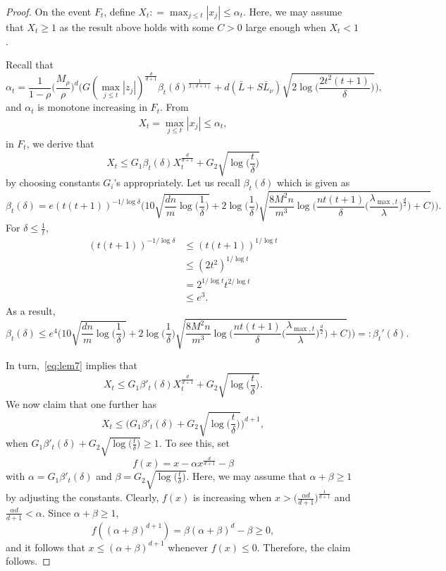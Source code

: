 \documentclass[11pt]{article}
\theoremstyle{plain}
\theoremstyle{definition}
\theoremstyle{remark}
\begin{document}
\begin{proof}
On the event $F_t$, define $X_t: = \max_{j\leq t}|x_j| \leq \alpha_t$. Here, we may assume that $X_t \geq 1$ as the result above holds with some $C>0$ large enough when $X_t <1$. 

Recall that 
\[
\alpha_t=\frac{1}{1-\rho}\bigg(\frac{M_{\rho}}{\rho}\bigg)^d\bigg(G(\max_{j \leq  t}|z_j|)^{\frac{d}{d+1}}\beta_{t}(\delta)^{\frac{1}{2(d+1)}}+d(\bar L+S\bar L_{\nu})\sqrt{2\log\bigg(\frac{2t^2(t+1)}{\delta}\bigg)}\bigg),
\]
and $\alpha_t$ is monotone increasing in $F_t$. From
\begin{align*}
X_t=\max_{j\leq t}|x_j| \leq \alpha_t,
\end{align*}
in $F_t$, we derive that
\begin{equation}\label{eq:lem7}
X_t \leq G_1 \beta_t(\delta) X_t^{\frac{d}{d+1}} + G_2 \sqrt{\log\bigg(\frac{t}{\delta}\bigg)}
\end{equation}
by choosing constants $G_i$'s appropriately. Let us recall $\beta_t(\delta)$ which is given as
\[
\beta_t(\delta) = e(t(t+1))^{-1/\log \delta}\bigg(10\sqrt{\frac{dn}{m}\log \bigg(\frac{1}{\delta}\bigg)}+ 2\log \bigg(\frac{1}{\delta}\bigg) \sqrt{\frac{8M^2n}{m^3}\log \bigg(\frac{nt(t+1)}{\delta}\bigg(\frac{\lambda_{\max,t}}{\lambda}\bigg)^{\frac{d}{2}}\bigg)+ C}\bigg)\bigg).
\]
For $\delta \leq \frac{1}{t}$, 
\begin{equation*}
    \begin{split}
        (t(t+1))^{-1/\log \delta} &\leq (t(t+1))^{1/\log t}\\ 
        &\leq (2t^2)^{1/\log t}\\
        &=2^{1/\log t} t^{2/ \log t}\\
        &\leq e^3.
    \end{split}
\end{equation*}
As a result, 
\[
\beta_t(\delta)\leq e^4\bigg(10\sqrt{\frac{dn}{m}\log \bigg(\frac{1}{\delta}\bigg)}+ 2\log \bigg(\frac{1}{\delta}\bigg) \sqrt{\frac{8M^2n}{m^3}\log \bigg(\frac{nt(t+1)}{\delta}\bigg(\frac{\lambda_{\max,t}}{\lambda}\bigg)^{\frac{d}{2}}\bigg)+ C}\bigg)\bigg)=:\beta_t'(\delta).
\]

In turn,~\eqref{eq:lem7} implies that
\[
X_t \leq G_1 \beta'_t(\delta) X_t^{\frac{d}{d+1}} + G_2 \sqrt{\log\bigg(\frac{t}{\delta}\bigg)}.
\]
We now claim that one further has
\begin{equation}\label{eq:lem_eq}
X_t \leq \bigg(G_1 \beta'_t(\delta)  + G_2 \sqrt{\log\bigg(\frac{t}{\delta}\bigg)}\bigg)^{d+1},
\end{equation}
when $G_1 \beta'_t(\delta) + G_2 \sqrt{\log\bigg(\frac{t}{\delta}\bigg)} \geq 1$. To see this, set
\[
f(x)=x- \alpha x^\frac{d}{d+1} - \beta
\]
with $\alpha=G_1 \beta'_t(\delta)$ and $\beta=G_2 \sqrt{\log\bigg(\frac{t}{\delta}\bigg)}$. Here, we may assume that $\alpha+\beta \geq 1$ by adjusting the constants. Clearly, $f(x)$ is increasing when $x>\bigg(\frac{\alpha d}{d+1}\bigg)^\frac{1}{d+1}$ and $\frac{\alpha d}{d+1}<\alpha$. Since $\alpha+\beta \geq 1$,
\[
f((\alpha+\beta)^{d+1}) = \beta(\alpha+\beta)^d - \beta \geq 0, 
\]
and it follows that $x \leq (\alpha+\beta)^{d+1}$ whenever $f(x)\leq 0$. Therefore, the claim follows. 


\end{proof}
\end{document}
